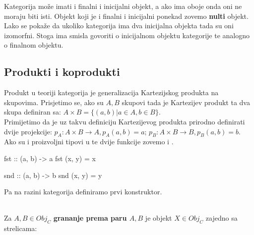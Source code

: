   Kategorija  može imati i finalni i inicijalni objekt, a ako ima
  oboje onda oni ne moraju biti isti. Objekt koji je i finalni i inicijalni ponekad
  zovemo \textbf{nulti} objekt. Lako se pokaže da ukoliko kategorija ima dva inicijalna
  objekta tada su oni izomorfni. Stoga ima smisla govoriti o inicijalnom objektu
  kategorije te analogno o finalnom objektu.
  
  \subsection{Produkti i koprodukti}
  Produkt u teoriji kategorija je generalizacija Kartezijskog produkta na
  skupovima. Prisjetimo se, ako su $A, B$ skupovi tada je Kartezijev produkt ta
  dva skupa definiran sa: $A \times B = \{ (a, b) | a \in A, b \in B\}$.\\
  
  \noindent Primijetimo da je uz takvu definiciju Kartezijevog produkta prirodno
  definirati dvije projekcije:
    $p_A : A \times B \to A, p_A(a, b) = a$; 
    $p_B : A \times B \to B, p_B(a, b) = b$.\\

  \noindent Ako su  i  proizvoljni tipovi u  te dvije
  funkcije zovemo  i .
  \begin{mcode}
    fst :: (a, b) -> a
    fst (x, y) = x

    snd :: (a, b) -> b
    snd (x, y) = y
  \end{mcode}
  Pa na razini kategorija definiramo prvi konstruktor.\\
  
  \begin{definition}\ \\
  
    \noindent Za $A, B \in Obj_C$ \textbf{grananje prema paru $A, B$} je objekt $X \in
    Obj_C$
    zajedno sa strelicama:
  \begin{center}
  \end{center}
  \end{definition}
  
